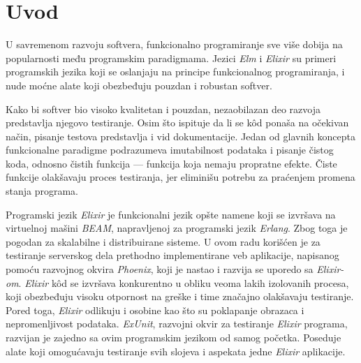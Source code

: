 \documentclass[12pt,oneside]{memoir}
\begin{document}
\frontmatter
\naslovna
\komisija
\apstrakt
\tableofcontents*

\mainmatter

\chapter{Uvod}
\par U savremenom razvoju softvera, funkcionalno programiranje sve više dobija na popularnosti među programskim paradigmama. Jezici \emph{Elm} i \emph{Elixir} su primeri programskih jezika koji se oslanjaju na principe funkcionalnog programiranja, i nude moćne alate koji obezbeđuju pouzdan i robustan softver. 
\par Kako bi softver bio visoko kvalitetan i pouzdan, nezaobilazan deo razvoja predstavlja njegovo testiranje. Osim što ispituje da li se k\^{o}d ponaša na očekivan način, pisanje testova predstavlja i vid dokumentacije. Jedan od glavnih koncepta funkcionalne paradigme podrazumeva imutabilnost podataka i pisanje čistog koda, odnosno čistih funkcija --- funkcija koja nemaju propratne efekte. Čiste funkcije olakšavaju proces testiranja, jer eliminišu potrebu za praćenjem promena stanja programa. 
\par Programski jezik \emph{Elixir} je funkcionalni jezik opšte namene koji se izvršava na virtuelnoj mašini \emph{BEAM}, napravljenoj za programski jezik \emph{Erlang}. Zbog toga je pogodan za skalabilne i distribuirane sisteme. U ovom radu korišćen je za testiranje serverskog dela prethodno implementirane veb aplikacije, napisanog pomoću razvojnog okvira \emph{Phoenix}, koji je nastao i razvija se uporedo sa \emph{Elixir-om}. \emph{Elixir} k\^{o}d se izvršava konkurentno u obliku veoma lakih izolovanih procesa, koji obezbeđuju visoku otpornost na greške i time značajno olakšavaju testiranje. Pored toga, \emph{Elixir} odlikuju i osobine kao što su poklapanje obrazaca i nepromenljivost podataka. \emph{ExUnit}, razvojni okvir za testiranje \emph{Elixir} programa, razvijan je zajedno sa ovim programskim jezikom od samog početka. Poseduje alate koji omogućavaju testiranje svih slojeva i aspekata jedne \emph{Elixir} aplikacije.
\end{document}
